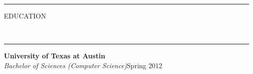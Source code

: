 \documentclass[10pt, letterpaper, oneside]{article}
\newcommand{\HRule}[2]{\textcolor{#1}{\rule{\linewidth}{#2}}}
\newcommand{\sectiontitle}[1]{\begin{minipage}{\textwidth}\HRule{black}{0.25mm}\vspace{-10pt}\begin{center}\Large\MakeUppercase{#1}\end{center}\end{minipage}\\\HRule{light-grey}{0.15mm}\vspace{\baselineskip}}
\newenvironment{tightressection}[1]{
  \begin{minipage}{\textwidth}
  \sectiontitle{#1}}
  {\vspace{\baselineskip}\end{minipage}}
\newenvironment{rescolumn}{
  \begin{minipage}{0.5\textwidth}
    \begin{itemize}[noitemsep,nolistsep]}
  {\end{itemize}
    \end{minipage}}
\newcommand{\resitem}[1]{
    \vspace{2pt}
    \item \begin{flushleft} #1 \end{flushleft}
}
\newcommand{\boardentry}[3]{
  \begin{minipage}{\textwidth}
  \vspace{-9pt}
  \textbf{#1}\\
  \textit{#2}, \textit{#3}\\
  \vspace{0.5\baselineskip}
  \end{minipage}
}
\newcommand{\resedentry}[3]{
  \begin{minipage}{\textwidth}
  \vspace{-10pt}
  \textbf{#1}\\
  \textit{#2}\hfill\textcolor{light-grey}{#3}\\
  \vspace{0.5\baselineskip}
  \end{minipage}
}
\begin{document}
 
 
\vspace{-15pt}
\begin{tightressection}{education}
  \resedentry{University of Texas at Austin}{Bachelor of Sciences (Computer Science)}{Spring 2012}
\end{tightressection}
 
\end{document}
